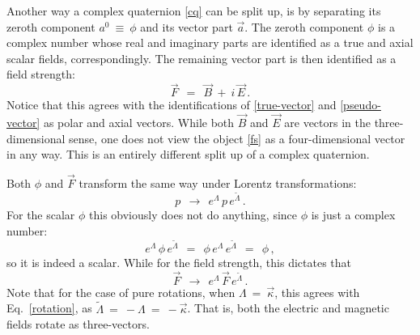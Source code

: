 \documentclass[epsfig,12pt]{article}
\newcommand{\wt}{\widetilde}
\begin{document}
	Another way a complex quaternion \eqref{cq} can be split up, is by separating its zeroth component $ a^0 ~\equiv~ \phi $
	and its vector part $ \vec a $.
	The zeroth component $ \phi $ is a complex number whose real and imaginary parts are identified
	as a true and axial scalar fields, correspondingly.
	The remaining vector part is then identified as a field strength:
\begin{equation}
\label{fs}
	\vec F	~~=~~	\vec B  ~+~  i\,\vec E\,.
\end{equation}
	Notice that this agrees with the identifications of \eqref{true-vector} and \eqref{pseudo-vector}
	as polar and axial vectors.
	While both $ \vec B $ and $ \vec E $ are vectors in the three-dimensional sense,
	one does not view the object \eqref{fs} as a four-dimensional vector in any way.
	This is an entirely different split up of a complex quaternion.

	Both $ \phi $ and $ \vec F $ transform the same way under Lorentz transformations:
\begin{equation}
	p	~~\to~~	e^\Lambda\,p\,e^{\wt\Lambda}\,.
\end{equation}
	For the scalar $ \phi $ this obviously does not do anything, since $ \phi $ is just a complex number:
\[
	e^\Lambda\,\phi\,e^{\wt\Lambda}	~~=~~	\phi\, e^\Lambda\, e^{\wt\Lambda}	~~=~~	\phi\,,
\]
	so it is indeed a scalar.
	While for the field strength, this dictates that
\begin{equation}
	\vec F		~~\to~~		e^\Lambda\,\vec F\,e^{\wt\Lambda}\,.
\end{equation}
	Note that for the case of pure rotations, when $ \Lambda ~=~ \vec\kappa $,
	this agrees with Eq.~\eqref{rotation}, as $ \wt\Lambda ~=~ -\Lambda ~=~ -\vec\kappa $.
	That is, both the electric and magnetic fields rotate as three-vectors.
\end{document}
